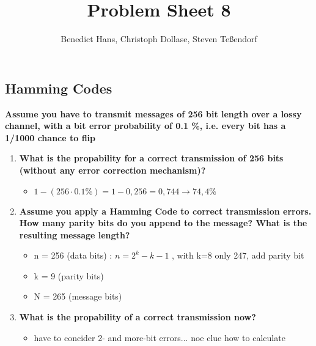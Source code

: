 \documentclass[a4paper,12pt]{article}
\author{Benedict Hans, Christoph Dollase, Steven Te\ss endorf}
\title{ \textbf{Problem Sheet 8}}
\begin{document}
	 
	\maketitle	 %
	
	\subsection{Hamming Codes}
	\textbf{Assume you have to transmit messages of 256 bit length over a lossy channel, with a bit error probability of 0.1 \%, i.e.  every bit has a 1/1000 chance to flip}
	\begin{enumerate}[label=(\roman*),itemsep=0pt]
		\item \textbf{What is the propability for a correct transmission of 256 bits (without any error correction mechanism)?}
		\begin{itemize}[itemsep=0pt]
			\item $1 - (256 \cdot 0.1\%) = 1 - 0,256 = 0,744 \rightarrow  74,4\%$
		\end{itemize}
		\item \textbf{Assume you apply a Hamming Code to correct transmission errors. How many parity bits do you append to the message?  What is the resulting message length?}
		\begin{itemize}[itemsep=0pt]
			\item n = 256 (data bits) : $n = 2^k - k - 1$ , with k=8 only 247, add parity bit
			\item k = 9 (parity bits)
			\item N = 265 (message bits)
		\end{itemize}
		\item \textbf{What is the propability of a correct transmission now?}
		\begin{itemize}[itemsep=0pt]
			\item have to concider 2- and more-bit errors... noe clue how to calculate
		\end{itemize}
	\end{enumerate}
	
	
\end{document}
